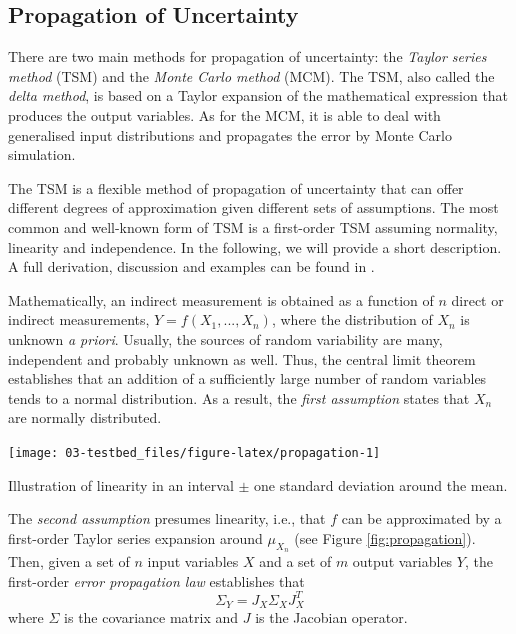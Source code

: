\documentclass[twoside,nohyper]{tufte-book}
\begin{document}
\hypertarget{propagation-of-uncertainty}{%
\subsection{Propagation of Uncertainty}\label{propagation-of-uncertainty}}

There are two main methods for propagation of uncertainty: the \emph{Taylor series method} (TSM) and the \emph{Monte Carlo method} (MCM). The TSM, also called the \emph{delta method}, is based on a Taylor expansion of the mathematical expression that produces the output variables. As for the MCM, it is able to deal with generalised input distributions and propagates the error by Monte Carlo simulation.

The TSM is a flexible method of propagation of uncertainty that can offer different degrees of approximation given different sets of assumptions. The most common and well-known form of TSM is a first-order TSM assuming normality, linearity and independence. In the following, we will provide a short description. A full derivation, discussion and examples can be found in \citet{Arras:1998}.

Mathematically, an indirect measurement is obtained as a function of \(n\) direct or indirect measurements, \(Y = f(X_1, ..., X_n)\), where the distribution of \(X_n\) is unknown \emph{a priori}. Usually, the sources of random variability are many, independent and probably unknown as well. Thus, the central limit theorem establishes that an addition of a sufficiently large number of random variables tends to a normal distribution. As a result, the \emph{first assumption} states that \(X_n\) are normally distributed.



\begin{marginfigure}[-1in]

{\centering \texttt{[image: 03-testbed\_files/figure-latex/propagation-1]} 

}

\caption[Illustration of linearity in an interval \(\pm\) one standard deviation around the mean.]{Illustration of linearity in an interval \(\pm\) one standard deviation around the mean.}\label{fig:propagation}
\end{marginfigure}

The \emph{second assumption} presumes linearity, i.e., that \(f\) can be approximated by a first-order Taylor series expansion around \(\mu_{X_n}\) (see Figure \ref{fig:propagation}). Then, given a set of \(n\) input variables \(X\) and a set of \(m\) output variables \(Y\), the first-order \emph{error propagation law} establishes that
%
\begin{equation}
  \Sigma_Y = J_X \Sigma_X J_X^T \label{eq:assumption2}
\end{equation}
%
where \(\Sigma\) is the covariance matrix and \(J\) is the Jacobian operator.
\end{document}
